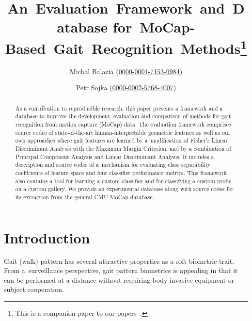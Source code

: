 \documentclass[10pt,a4paper]{llncs}
\begin{document}
\title{An~Evaluation~Framework~and~Database for~MoCap-Based~Gait~Recognition~Methods\thanks{This is a companion paper to our papers~\cite{BS16a,BS16b}.}}
\author{Michal Balazia (\href{https://orcid.org/0000-0001-7153-9984}{0000-0001-7153-9984}) \and Petr Sojka (\href{https://orcid.org/0000-0002-5768-4007}{0000-0002-5768-4007})}


\maketitle

\pagestyle{plain}
\thispagestyle{fancy}

\begin{abstract}
As a contribution to reproducible research, this paper presents a framework and a database to improve the development, evaluation and comparison of methods for gait recognition from motion capture (MoCap) data. The evaluation framework comprises source codes of state-of-the-art human-interpretable geometric features as well as our own approaches where gait features are learned by a~modification of Fisher's Linear Discriminant Analysis with the Maximum Margin Criterion, and by a combination of Principal Component Analysis and Linear Discriminant Analysis. It includes a description and source codes of a~mechanism for evaluating class separability coefficients of feature space and four classifier performance metrics. This framework also contains a tool for learning a custom classifier and for classifying a custom probe on a custom gallery. We provide an experimental database along with source codes for its extraction from the general CMU MoCap database.
\end{abstract}

\section{Introduction}
\label{intro}
Gait (walk) pattern has several attractive properties as a soft biometric trait. From a~surveillance perspective, gait pattern biometrics is appealing in that it can be performed at a distance without requiring body-invasive equipment or subject cooperation.
\end{document}
